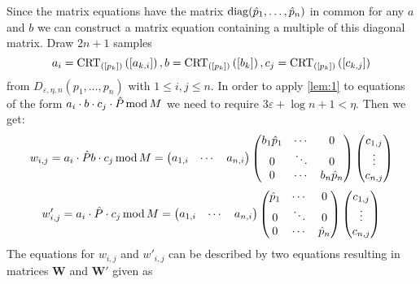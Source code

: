 \documentclass[english]{scrartcl}
\theoremstyle{plain}
\theoremstyle{definition}
\begin{document}
    Since the matrix equations have the matrix $\operatorname{diag}(\hat{p}_1, \dots, \hat{p}_n)$ in common for any $a$ and $b$ we can construct a matrix equation containing a multiple of this diagonal matrix.
    Draw $2n+1$ samples
    \begin{equation*}
        a_i = \operatorname{CRT}_{([p_{k}])}\left(\left[a_{k, i}\right]\right), b = \operatorname{CRT}_{([p_{k}])}\left(\left[b_k\right]\right), c_j = \operatorname{CRT}_{([p_{k}])}\left(\left[c_{k, j}\right]\right)
    \end{equation*}
    from $D_{\varepsilon, \eta, n}(p_1, \dots, p_n)$ with $1 \leq i,j \leq n$. In order to apply \cref{lem:1} to equations of the form $a_i \cdot b \cdot c_j \cdot \hat{P} \operatorname{mod} M$ we need to require $3\varepsilon + \log n + 1 < \eta$. Then we get:
    \begin{equation*}
        w_{i,j} = a_i \cdot \hat{P} b \cdot c_j \operatorname{mod} M =
        \begin{pmatrix}
            a_{1, i} & \cdots & a_{n, i}
        \end{pmatrix}
        \begin{pmatrix}
            b_1 \hat{p}_1 & \cdots & 0 \\
            0 & \ddots & 0 \\
            0 & \cdots & b_n \hat{p}_n
        \end{pmatrix}
        \begin{pmatrix}
            c_{1, j} \\
            \vdots \\
            c_{n, j}
        \end{pmatrix}
    \end{equation*}
    \begin{equation*}
        w'_{i,j} = a_i \cdot \hat{P} \cdot c_j \operatorname{mod} M =
        \begin{pmatrix}
            a_{1, i} & \cdots & a_{n, i}
        \end{pmatrix}
        \begin{pmatrix}
            \hat{p}_1 & \cdots & 0 \\
            0 & \ddots & 0 \\
            0 & \cdots & \hat{p}_n
        \end{pmatrix}
        \begin{pmatrix}
            c_{1, j} \\
            \vdots \\
            c_{n, j}
        \end{pmatrix}
    \end{equation*}
    The equations for $w_{i,j}$ and $w'_{i,j}$ can be described by two equations resulting in matrices $\mathbf{W}$ and $\mathbf{W'}$ given as
\end{document}
